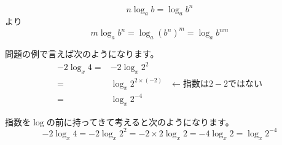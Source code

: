 \documentclass[12pt,b5paper]{ltjsarticle}
\begin{document}
\begin{equation}
  n\log_a{b} = \log_a{b}^n
\end{equation}
より
\begin{equation}
 m\log_a{b^n} = \log_a{(b^n)^m} = \log_a{b^{nm}}
\end{equation}

問題の例で言えば次のようになります。
\begin{align}
 -2\log_x{4} =& -2\log_x{2^2}\\
  =& \log_x{2^{2\times(-2)}} & \leftarrow \text{指数は} 2-2 \text{ではない}\\
  =& \log_x{2^{-4}}
\end{align}

指数を$\log$の前に持ってきて考えると次のようになります。
\begin{equation}
 -2\log_x{4} = -2\log_x{2^2} = -2\times 2\log_x{2} =-4\log_x{2} =\log_x{2^{-4}}
\end{equation}
\end{document}
